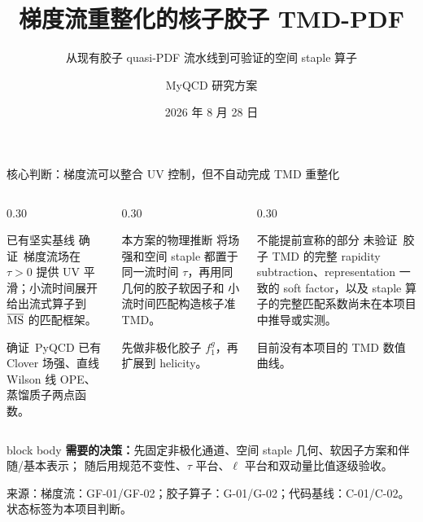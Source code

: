 \documentclass[UTF8,aspectratio=169,11pt]{ctexbeamer}
\title[核子胶子 TMD-PDF]{梯度流重整化的核子胶子 TMD-PDF}
\subtitle{从现有胶子 quasi-PDF 流水线到可验证的空间 staple 算子}
\author[MyQCD 研究方案]{MyQCD 研究方案}
\institute{格点 QCD：物理定义、代码路径与验证门槛}
\date{2026 年 8 月 28 日}
\newcommand{\source}[1]{%
  \par\vspace{0.05em}%
  {\raggedright\scriptsize\color{muted}来源：#1\par}}
\newcommand{\verified}{\textcolor{evidence}{确证}}
\newcommand{\unverified}{\textcolor{warning}{未验证}}
\begin{document}
\begin{frame}[plain]
  \titlepage
\end{frame}

\begin{frame}[t]{核心判断：梯度流可以整合 UV 控制，但不自动完成 TMD 重整化}
  \begin{columns}[T,totalwidth=\textwidth]
    \begin{column}{0.30\textwidth}
      \begin{block}{已有坚实基线}
        \verified\ 梯度流场在 $\tau>0$ 提供 UV 平滑；小流时间展开给出流式算子到
        $\overline{\rm MS}$ 的匹配框架。

        \verified\ PyQCD 已有 Clover 场强、直线 Wilson 线 OPE、蒸馏质子两点函数。
      \end{block}
    \end{column}
    \begin{column}{0.30\textwidth}
      \begin{block}{本方案的物理推断}
        将场强和空间 staple 都置于同一流时间 $\tau$，再用同几何的胶子软因子和
        小流时间匹配构造核子准 TMD。

        先做非极化胶子 $f_1^g$，再扩展到 helicity。
      \end{block}
    \end{column}
    \begin{column}{0.30\textwidth}
      \begin{block}{不能提前宣称的部分}
        \unverified\ 胶子 TMD 的完整 rapidity subtraction、representation 一致的
        soft factor，以及 staple 算子的完整匹配系数尚未在本项目中推导或实测。

        目前没有本项目的 TMD 数值曲线。
      \end{block}
    \end{column}
  \end{columns}
  \vfill
  \begin{beamercolorbox}[wd=\textwidth,sep=0.65em,rounded=true]{block body}
    \textbf{需要的决策：}先固定非极化通道、空间 staple 几何、软因子方案和伴随/基本表示；
    随后用规范不变性、$\tau$ 平台、$\ell$ 平台和双动量比值逐级验收。
  \end{beamercolorbox}
  \source{梯度流：GF-01/GF-02；胶子算子：G-01/G-02；代码基线：C-01/C-02。状态标签为本项目判断。}
\end{frame}
\end{document}
